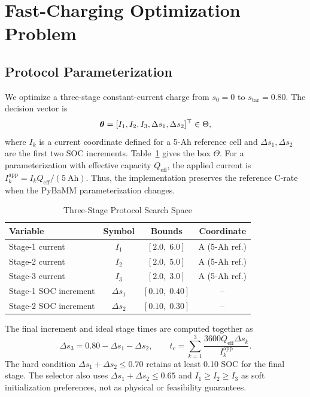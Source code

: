 \section{Fast-Charging Optimization Problem}
\label{sec:problem}

\subsection{Protocol Parameterization}

We optimize a three-stage constant-current charge from
$s_0=0$ to $s_{\mathrm{tar}}=0.80$. The decision vector is
\begin{equation}
\boldsymbol{\theta}=[I_1,I_2,I_3,\Delta s_1,\Delta s_2]^\top\in\Theta ,
\label{eq:theta}
\end{equation}
where $I_k$ is a current coordinate defined for a 5-Ah reference cell and
$\Delta s_1,\Delta s_2$ are the first two SOC increments.
Table~\ref{tab:variables} gives the box $\Theta$. For a parameterization with
effective capacity $Q_{\mathrm{eff}}$, the applied current is
$I_k^{\mathrm{app}}=I_kQ_{\mathrm{eff}}/(5~\mathrm{Ah})$. Thus, the
implementation preserves the reference C-rate when the PyBaMM
parameterization changes.

\begin{table}[!t]
\caption{Three-Stage Protocol Search Space}
\label{tab:variables}
\centering
\begin{tabular}{lccc}
\toprule
Variable & Symbol & Bounds & Coordinate \\
\midrule
Stage-1 current & $I_1$ & $[2.0,\;6.0]$ & A (5-Ah ref.) \\
Stage-2 current & $I_2$ & $[2.0,\;5.0]$ & A (5-Ah ref.) \\
Stage-3 current & $I_3$ & $[2.0,\;3.0]$ & A (5-Ah ref.) \\
Stage-1 SOC increment & $\Delta s_1$ & $[0.10,\;0.40]$ & -- \\
Stage-2 SOC increment & $\Delta s_2$ & $[0.10,\;0.30]$ & -- \\
\bottomrule
\end{tabular}
\end{table}

The final increment and ideal stage times are computed together as
\begin{equation}
\Delta s_3=0.80-\Delta s_1-\Delta s_2,\qquad
t_c=\sum_{k=1}^{3}\frac{3600Q_{\mathrm{eff}}\Delta s_k}
{I_k^{\mathrm{app}}}.
\label{eq:stages_time}
\end{equation}
The hard condition $\Delta s_1+\Delta s_2\leq0.70$ retains at least
0.10 SOC for the final stage. The selector also uses
$\Delta s_1+\Delta s_2\leq0.65$ and $I_1\geq I_2\geq I_3$ as soft
initialization preferences, not as physical or feasibility guarantees.

